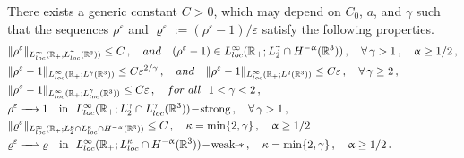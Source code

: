 \documentclass[10pt,a4paper]{amsart}
\def \R{{\mathbb{R}}}
\begin{document}
\begin{lemma}
  \label{lem:cv-rho-R}
  There exists a generic constant $C>0$, which may depend on $C_0$,  $a$, and $\gamma$ such that the sequences ${\rho^\varepsilon}$ and  $\varrho^\varepsilon:=(\rho^\varepsilon -1)/\varepsilon$ satisfy the following properties.
  \begin{align*}
    &\| \rho^\varepsilon \|_{ L_{\rm loc}^\infty(\R_+; L_{\rm loc }^\gamma(\R^3))} \leq C\,,
    \quad {\rm and} \quad (\rho^\varepsilon -1) \in L_{\rm loc}^\infty(\R_+; L_2^\gamma \cap H^{-\upalpha}(\R^3))\,, \quad \forall \,\gamma>1 \,, \quad \upalpha \geq 1/2\,,\\
    &\| \rho^\varepsilon -1\|_{ L_{\rm loc}^\infty(\R_+; L^\gamma(\R^3))} \leq  C \varepsilon^{2/\gamma}\,,
    \quad {\rm and} \quad  \| \rho^\varepsilon -1\|_{ L_{\rm loc}^\infty(\R_+; L^2(\R^3))} \leq  C \varepsilon\,,
     \quad \forall\, \gamma \geq 2\,, \\
    & \| \rho^\varepsilon -1\|_{ L_{\rm loc}^\infty(\R_+; L_{\rm loc}^\gamma(\R^3))} \leq  C \varepsilon\,, \quad {\rm for} \ {\rm all } \ \  1<\gamma <2\,,\\
    & \rho^\varepsilon \xrightarrow{\quad} 1 \ \ \mbox{ \rm in } \  L_{\rm loc}^\infty(\R_+; L_2^\gamma \cap  L_{\rm loc}^\gamma(\R^3))\!-\!\mbox{\rm strong}\,, \quad  \forall\, \gamma >1\,,\\
    &  \| \varrho^\varepsilon \|_{ L_{\rm loc}^\infty(\R_+; L_2^\kappa\cap L_{\rm loc }^\kappa\cap H^{-\upalpha}(\R^3))} \leq C\,, 
    \quad \kappa=\min\{2,\gamma\} \,, \quad \upalpha\geq 1/2\\ 
    & \varrho^\varepsilon \xrightharpoonup{\quad} \varrho\ \  \mbox{ \rm in } \  L_{\rm loc}^\infty(\R_+; L_{\rm loc }^\kappa \cap H^{-\upalpha}(\R^3))\!-\!\mbox{\rm weak--}\!\ast\,,  \quad \kappa=\min\{2,\gamma\} \,, \quad \upalpha\geq 1/2\,.
  \end{align*}
\end{lemma}
\end{document}
